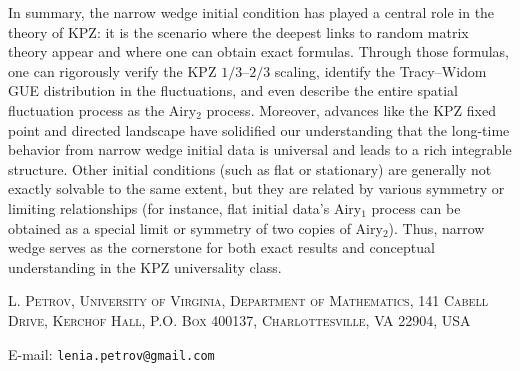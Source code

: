 \documentclass[letterpaper,11pt,oneside,reqno]{article}
\numberwithin{equation}{section}
\theoremstyle{definition}
\begin{document}
In summary, the narrow wedge initial condition has played a central role in the theory of KPZ: it is the scenario where the deepest links to random matrix theory appear and where one can obtain exact formulas. Through those formulas, one can rigorously verify the KPZ $1/3$–$2/3$ scaling, identify the Tracy–Widom GUE distribution in the fluctuations, and even describe the entire spatial fluctuation process as the Airy$_2$ process. Moreover, advances like the KPZ fixed point and directed landscape have solidified our understanding that the long-time behavior from narrow wedge initial data is universal and leads to a rich integrable structure. Other initial conditions (such as flat or stationary) are generally not exactly solvable to the same extent, but they are related by various symmetry or limiting relationships (for instance, flat initial data’s Airy$_1$ process can be obtained as a special limit or symmetry of two copies of Airy$_2$). Thus, narrow wedge serves as the cornerstone for both exact results and conceptual understanding in the KPZ universality class.



















%









\medskip

\textsc{L. Petrov, University of Virginia, Department of Mathematics, 141 Cabell Drive, Kerchof Hall, P.O. Box 400137, Charlottesville, VA 22904, USA}

E-mail: \texttt{lenia.petrov@gmail.com}
\end{document}
